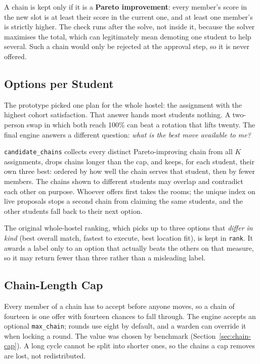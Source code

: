 A chain is kept only if it is a \textbf{Pareto improvement}: every
member's score in the new slot is at least their score in the current
one, and at least one member's is strictly higher. The check runs after
the solve, not inside it, because the solver maximises the total, which
can legitimately mean demoting one student to help several. Such a
chain would only be rejected at the approval step, so it is never
offered.

\subsection{Options per Student}

The prototype picked one plan for the whole hostel: the assignment with
the highest cohort satisfaction. That answer hands most students
nothing. A two-person swap in which both reach 100\% can beat a rotation
that lifts twenty. The final engine answers a different question:
\emph{what is the best move available to me?}

\texttt{candidate\_chains} collects every distinct Pareto-improving chain
from all $K$ assignments, drops chains longer than the cap, and keeps,
for each student, their own three best: ordered by how well the chain
serves that student, then by fewer members. The chains shown to
different students may overlap and contradict each other on purpose.
Whoever offers first takes the rooms; the unique index on live
proposals stops a second chain from claiming the same students, and the
other students fall back to their next option.

The original whole-hostel ranking, which picks up to three options that
\emph{differ in kind} (best overall match, fastest to execute, best
location fit), is kept in \texttt{rank}. It awards a label only to an
option that actually beats the others on that measure, so it may return
fewer than three rather than a misleading label.

\subsection{Chain-Length Cap}

Every member of a chain has to accept before anyone moves, so a chain of
fourteen is one offer with fourteen chances to fall through. The engine
accepts an optional \texttt{max\_chain}; rounds use eight by default,
and a warden can override it when locking a round. The value was chosen
by benchmark (Section~\ref{sec:chain-cap}). A long cycle cannot be split
into shorter ones, so the chains a cap removes are lost, not
redistributed.

